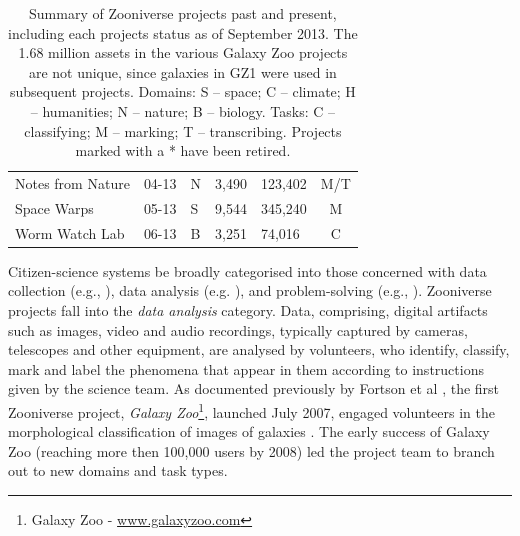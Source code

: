 \documentclass{sigchi}
\begin{document}
\begin{table}
\begin{center}
\begin{tabular}{p{2.2cm}lp{0.7cm}llc}
Notes from Nature & 04-13 & N & 3,490 & 123,402 & M/T \\
Space Warps & 05-13 & S & 9,544 & 345,240 & M \\
Worm Watch Lab & 06-13 & B & 3,251 & 74,016 & C \\
\hline
\end{tabular}
\normalsize
\label{table:project-summary}
\caption{Summary of Zooniverse projects past and present, including each projects status as of September 2013.  The 1.68 million assets in the various Galaxy Zoo projects are not unique, since galaxies in GZ1 were used in subsequent projects. Domains: S -- space; C -- climate; H -- humanities; N -- nature; B -- biology. Tasks: C -- classifying; M -- marking; T -- transcribing. Projects marked with a * have been retired.}
\end{center}
\end{table}

Citizen-science systems be broadly categorised into those concerned with data collection (e.g., \cite{zook2010volunteered,wood2011ebird}), data analysis (e.g. \cite{westphal2005stardust,heinzelman2010crowdsourcing}), and problem-solving (e.g., \cite{khatib2011algorithm,cordero2012rna}).  Zooniverse projects fall into the \emph{data analysis} category.  Data, comprising, digital artifacts such as images, video and audio recordings, typically captured by cameras, telescopes and other equipment, are analysed by volunteers, who identify, classify, mark and label the phenomena that appear in them according to instructions given by the science team. As documented previously by Fortson et al \cite{fortson2011galaxy}, the first Zooniverse project, \emph{Galaxy Zoo}\footnote{Galaxy Zoo - \url{www.galaxyzoo.com}}, launched July 2007, engaged volunteers in the morphological classification of images of galaxies \cite{lintott2008galaxy}. The early success of Galaxy Zoo (reaching more then 100,000 users by 2008) led the project team to branch out to new domains and task types. 
\end{document}
